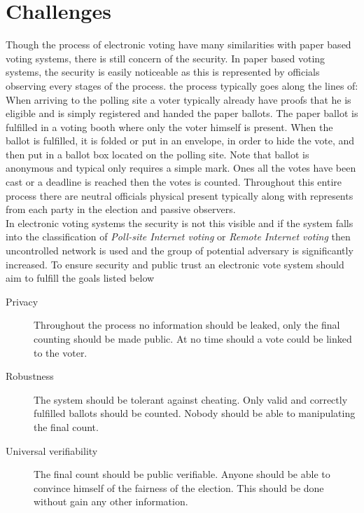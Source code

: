 \section{Challenges}
Though the process of electronic voting have many similarities with paper based voting systems, there is still concern of the security. In paper based voting systems, the security is easily noticeable as this is represented by officials observing every stages of the process. the process typically goes along the lines of: When arriving to the polling site a voter typically already have proofs that he is eligible and is simply registered and handed the paper ballots. The paper ballot is fulfilled in a voting booth where only the voter himself is present. When the ballot is fulfilled, it is folded or put in an envelope, in order to hide the vote, and then put in a ballot box located on the polling site. Note that ballot is anonymous and typical only requires a simple mark. Ones all the votes have been cast or a deadline is reached then the votes is counted. Throughout this entire process there are neutral officials physical present typically along with represents from each party in the election and passive observers.   \\

\noindent
In electronic voting systems the security is not this visible and if the system falls into the classification of \textit{Poll-site Internet voting} or \textit{Remote Internet voting} then uncontrolled network is used and the group of potential adversary is significantly increased.
To ensure security and public trust an electronic vote system should aim to fulfill the goals 
listed below \cite{Damgaard2003}

\begin{description}
    \item[Privacy] Throughout the process no information should be leaked, only the final counting
    should be made public. At no time should a vote could be linked to the voter. 
    
    \item[Robustness] The system should be tolerant against cheating. Only valid and correctly fulfilled ballots should be counted. Nobody should be able to manipulating the final count.

    \item[Universal verifiability] The final count should be public verifiable. Anyone should be able to convince himself of the fairness of the election. This should be done without gain any other information.
        
\end{description}

